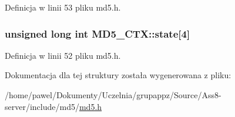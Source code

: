 Definicja w linii 53 pliku md5.h.\hypertarget{a00003_2f697997f51de65d08227fdf1d5c44b8}{
\subsubsection[{state}]{\setlength{\rightskip}{0pt plus 5cm}unsigned long int {\bf MD5\_\-CTX::state}\mbox{[}4\mbox{]}}}
\label{a00003_2f697997f51de65d08227fdf1d5c44b8}




Definicja w linii 52 pliku md5.h.

Dokumentacja dla tej struktury została wygenerowana z pliku:\begin{CompactItemize}
\item 
/home/pawel/Dokumenty/Uczelnia/grupappz/Source/Ass8-server/include/md5/\hyperlink{a00010}{md5.h}\end{CompactItemize}
